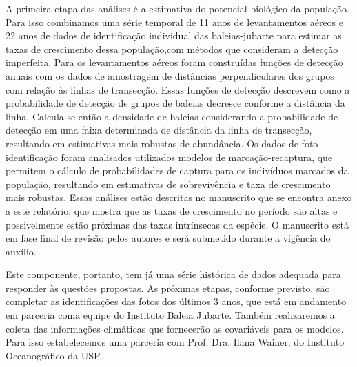 A primeira etapa das análises é a estimativa do potencial biológico da população.
Para isso combinamos uma série temporal de 11 anos de levantamentos aéreos e 22
anos de dados de identificação individual das baleias-jubarte 
para estimar as taxas de crescimento dessa população,com métodos que consideram a
detecção imperfeita. Para os levantamentos aéreos
foram construídas funções de detecção anuais com os dados de
amostragem de distâncias perpendiculares dos grupos com relação às
linhas de transecção. Essas funções de detecção descrevem como a
probabilidade de detecção de grupos de baleias decresce conforme a
distância da linha. Calcula-se então a densidade de baleias
considerando a probabilidade de detecção em uma faixa determinada de
distância da linha de transecção, resultando em estimativas mais
robustas de abundância. Os dados de foto-identificação foram
analisados utilizados modelos de marcação-recaptura, que permitem o
cálculo de probabilidades de captura para os indivíduos marcados da
população, resultando em estimativas de sobrevivência e taxa de
crescimento mais robustas. Essas análises estão descritas no
manuscrito que se encontra anexo a este relatório, que mostra que
as taxas de crescimento no período são altas e possivelmente estão próximas
das taxas intrínsecas da espécie. O manuscrito está
em fase final de revisão pelos autores e será submetido durante a
vigência do auxílio.

Este componente, portanto, tem já uma série histórica de dados adequada
para responder às questões propostas. As próximas etapas, conforme previsto,
são completar as identificações das fotos dos últimos 3 anos, que está em andamento
em parceria coma equipe do Instituto Baleia Jubarte. 
Também realizaremos a  coleta das informações climáticas 
que fornecerão as covariáveis para os modelos. Para isso estabelecemos uma 
parceria com Prof. Dra. Ilana Wainer, do Instituto Oceanográfico da USP.

